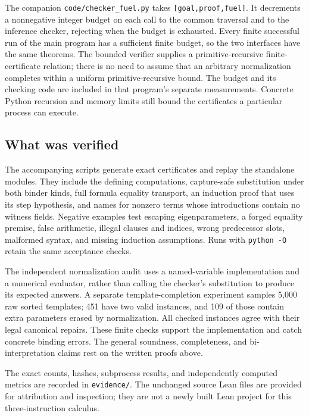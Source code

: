 \documentclass[11pt]{article}
\theoremstyle{definition}\newtheorem{definition}[theorem]{Definition}
\theoremstyle{remark}\newtheorem{remark}[theorem]{Remark}
\newcommand{\file}[1]{\texttt{\small\nolinkurl{#1}}}
\begin{document}
The companion \file{code/checker_fuel.py} takes
\texttt{[goal,proof,fuel]}. It decrements a nonnegative integer budget on
each call to the common traversal and to the inference checker, rejecting
when the budget is exhausted. Every finite successful run of the main
program has a sufficient finite budget, so the two interfaces have the
same theorems. The bounded verifier supplies a primitive-recursive
finite-certificate relation; there is no need to assume that an arbitrary
normalization completes within a uniform primitive-recursive bound.
The budget and its checking code are included in that program's separate
measurements. Concrete Python recursion and memory limits still bound
the certificates a particular process can execute.

\subsection{What was verified}

The accompanying scripts generate exact certificates and replay the
standalone modules. They include the defining computations, capture-safe
substitution under both binder kinds, full formula equality transport,
an induction proof that uses its step hypothesis, and names for nonzero
terms whose introductions contain no witness fields. Negative examples
test escaping eigenparameters, a forged equality premise, false arithmetic,
illegal clauses and indices, wrong predecessor slots, malformed syntax,
and missing induction assumptions. Runs with \texttt{python -O} retain
the same acceptance checks.

The independent normalization audit uses a named-variable implementation
and a numerical evaluator, rather than calling the checker's substitution
to produce its expected answers. A separate template-completion experiment
samples 5,000 raw sorted templates; 451 have two valid instances, and 109
of those contain extra parameters erased by normalization. All checked
instances agree with their legal canonical repairs. These finite checks
support the implementation and catch concrete binding errors. The general
soundness, completeness, and bi-interpretation claims rest on the written
proofs above.

The exact counts, hashes, subprocess results, and independently computed
metrics are recorded in \file{evidence/}. The unchanged source Lean files
are provided for attribution and inspection; they are not a newly built
Lean project for this three-instruction calculus.
\end{document}
